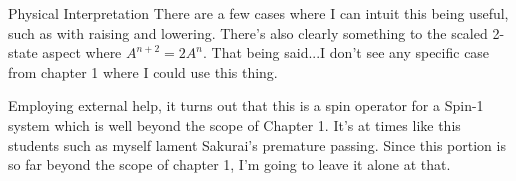 \begin{answer}
  \begin{answerpart}{Physical Interpretation}
    There are a few cases where I can intuit this being useful, such
    as with raising and lowering.  There's also clearly something to
    the scaled 2-state aspect where $A^{n+2} = 2A^{n}$.  That being
    said...I don't see any specific case from chapter 1 where I could
    use this thing.

    Employing external help, it turns out that this is a spin operator
    for a Spin-1 system which is well beyond the scope of Chapter 1.
    It's at times like this students such as myself lament Sakurai's
    premature passing.  Since this portion is so far beyond the scope
    of chapter 1, I'm going to leave it alone at that.
  \end{answerpart}

\end{answer}
